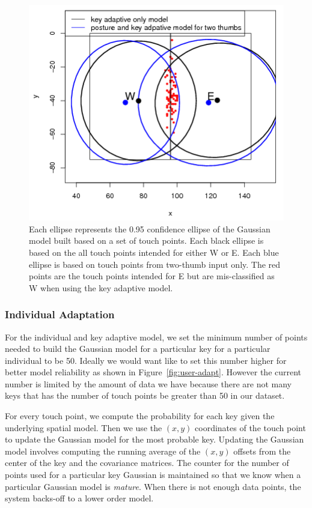 \documentclass{sigchi}
\begin{document}
\begin{figure}[tb]
  \centering
  \includegraphics[width=1\columnwidth]{figures/key-posture-ellipse.png}
  \caption{Each ellipse represents the 0.95 confidence ellipse of the Gaussian model built based on a set of touch points. Each black ellipse is based on the all touch points intended for either W or E. Each blue ellipse is based on touch points from two-thumb input only. The red points are the touch points intended for E but are mis-classified as W when using the key adaptive model. 
}
  \label{fig:e-w-ellipses}
\end{figure}

\subsubsection{Individual Adaptation}
For the individual and key adaptive model, we set the minimum number of points needed to build the
Gaussian model for a particular key for a particular individual to be 50. Ideally we would want like to set this number higher for better model reliability as shown in Figure~\ref{fig:user-adapt}. However the current number is 
limited by the amount of data we have because there are not many keys that has 
the number of touch points be greater than 50 in our dataset. 

For every touch point, we compute the probability for each key given the underlying spatial model. Then we use the $(x, y)$ coordinates of the touch point to update the Gaussian model
for the most probable key. Updating the Gaussian model involves computing the running
average of the $(x, y)$ offsets from the center of the key and the covariance matrices. The counter for the number of points used for a particular key Gaussian is maintained so that we
know when a particular Gaussian model is \textit{mature}. When there is not enough data points, the system backs-off to a lower order model.
\end{document}
